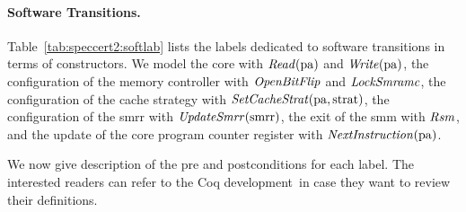\paragraph{Software Transitions.}
%
Table~\ref{tab:speccert2:softlab} lists the labels dedicated to software
transitions in terms of constructors.
%
We model the core \IOs with \( \mathit{Read}(\mathrm{pa}) \) and
\( \mathit{Write}(\mathrm{pa}) \), the configuration of the memory controller with
\( \mathit{OpenBitFlip} \) and \( \mathit{LockSmramc} \), the configuration of the
cache strategy with \( \mathit{SetCacheStrat}(\mathrm{pa}, \mathrm{strat}) \), the
configuration of the \ac{smrr} with \( \mathit{UpdateSmrr}(\mathrm{smrr}) \), the
exit of the \ac{smm} with $\mathit{Rsm}$, and the update of the core program
counter register with $\mathit{NextInstruction}(\mathrm{pa})$.


We now give description of the pre and postconditions for each label.
%
The interested readers can refer to the Coq
development\,\cite{letan2016speccertcode} in case they want to review their
definitions.
%

